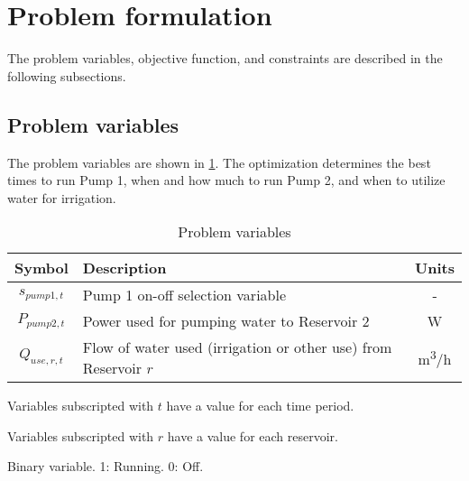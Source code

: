 \section{Problem formulation}
\label{sec:problem-formulation}

The problem variables, objective function, and constraints are described in the following subsections.

\subsection{Problem variables}

The problem variables are shown in \cref{table:variables}. The optimization determines the best times to run Pump 1, when and how much to run Pump 2, and when to utilize water for irrigation.

\begin{table}[t]
	\begin{threeparttable}[b]
		\caption{Problem variables}
		\label{table:variables}
		\begin{tabular}{cp{}c}
			\toprule 
			Symbol & Description & Units \\
			\midrule
			$s_{pump1,t}$ & Pump 1 on-off selection variable\tnote{3} & - \\
			$P_{pump2,t}$ & Power used for pumping water to Reservoir 2 & \si{W} \\
			$Q_{use,r,t}$ & Flow of water used (irrigation or other use) from Reservoir $r$ & \si{m^3/h} \\
			\bottomrule
		\end{tabular}
		\begin{tablenotes}
			\footnotesize
			\item [1] Variables subscripted with $t$ have a value for each time period.
			\item [2] Variables subscripted with $r$ have a value for each reservoir.
			\item [3] Binary variable. 1: Running. 0: Off.
		\end{tablenotes}
	\end{threeparttable}
\end{table}

